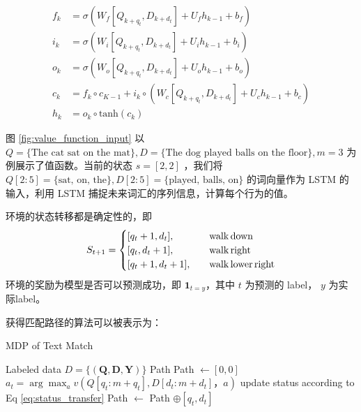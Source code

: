 \begin{equation}
\label{eq:LSTM}
\begin{aligned}
f_k &= \sigma(W_f[Q_{k+q_{t}}, D_{k+d_{t}}] + U_fh_{k-1} + b_f) \\
i_k &= \sigma(W_i[Q_{k+q_{t}}, D_{k+d_{t}}] + U_ih_{k-1} + b_i) \\
o_k &= \sigma(W_o[Q_{k+q_{t}}, D_{k+d_{t}}] + U_oh_{k-1} + b_o) \\
c_k &= f_k \circ c_{K-1} + i_k \circ (W_c[Q_{k+q_{t}}, D_{k+d_{t}}] + U_ch_{k-1}+b_c) \\
h_k &= o_k \circ \text{tanh}(c_k)
\end{aligned}
\end{equation}

图 \ref{fig:value_function_input} 以 $Q=\{\text{The cat sat on the mat}\},D=\{\text{The dog played balls on the floor}\}, m=3$ 为例展示了值函数。当前的状态 $s=[2, 2]$ ，我们将 $Q[2:5]=\{\text{sat, on, the}\}, D[2:5]=\{\text{played, balls, on}\}$ 的词向量作为 LSTM 的输入，利用 LSTM 捕捉未来词汇的序列信息，计算每个行为的值。

环境的状态转移都是确定性的，即
\begin{equation}
\label{eq:status_transfer}
S_{t+1} =
\begin{cases}
[q_{t} + 1, d_{t}], & \quad{\rm walk\,down} \\
[q_{t}, d_{t} + 1], & \quad{\rm walk\,right} \\
[q_{t} + 1, d_{t}+1], & \quad{\rm walk\,lower\,right}
\end{cases}
\end{equation}
环境的奖励为模型是否可以预测成功，即 $\mathbf{1}_{t=y}$，其中 $t$ 为预测的 label， $y$ 为实际label。

获得匹配路径的算法可以被表示为：
\begin{algorithm}[!htbp]
    \small
    \caption{MDP of Text Match}\label{alg:MDP_TM}
    \renewcommand{\algorithmicrequire}{\textbf{Input:}}
    \renewcommand{\algorithmicensure}{\textbf{Output:}}
    \begin{algorithmic}
        \Require Labeled data $D=\{ (\mathbf{Q}, \mathbf{D}, \mathbf{Y}) \}$
        \Ensure Path
        \State {} Path $\leftarrow [0, 0]$
        \State $a_t = \arg\max_a v(Q [q_t:m+q_t], D [d_t:m+d_t]， a)$
        \State update status according to Eq \ref{eq:status_transfer}
        \State Path $\leftarrow$ Path $\oplus [q_t, d_t]$ 
        \EndWhile
    \end{algorithmic}
\end{algorithm}

